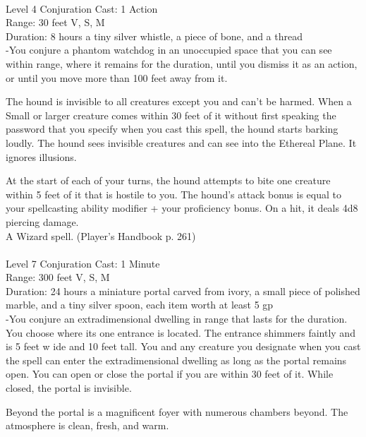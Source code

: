 \documentclass[10pt,twocolumn]{report}
\begin{document}
 \\
Level 4 \quad Conjuration \quad Cast: 1 Action\\
Range: 30 feet \quad V, S, M\\
Duration: 8 hours \quad a tiny silver whistle, a piece of bone, and a thread\\
-You conjure a phantom watchdog in an unoccupied space that you can see within range, where it remains for the duration, until you dismiss it as an action, or until you move more than 100 feet away from it.

The hound is invisible to all creatures except you and can’t be harmed. When a Small or larger creature comes within 30 feet of it without first speaking the password that you specify when you cast this spell, the hound starts barking loudly. The hound sees invisible creatures and can see into the Ethereal Plane. It ignores illusions.

At the start of each of your turns, the hound attempts to bite one creature within 5 feet of it that is hostile to you. The hound’s attack bonus is equal to your spellcasting ability modifier + your proficiency bonus. On a hit, it deals 4d8 piercing damage.\\
A Wizard spell. (Player's Handbook p. 261) \\


 \\
Level 7 \quad Conjuration \quad Cast: 1 Minute\\
Range: 300 feet \quad V, S, M\\
Duration: 24 hours \quad a miniature portal carved from ivory, a small piece of polished marble, and a tiny silver spoon, each item worth at least 5 gp\\
-You conjure an extradimensional dwelling in range that lasts for the duration.
You choose where its one entrance is located. The entrance shimmers faintly and is 5 feet w ide and 10 feet tall. You and any creature you designate when you cast the spell can enter the extradimensional dwelling as long as the portal remains open. You can open or close the portal if you are within 30 feet of it. While closed, the portal is invisible.

Beyond the portal is a magnificent foyer with numerous chambers beyond. The atmosphere is clean, fresh, and warm.
\end{document}
